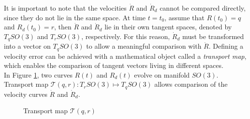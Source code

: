 It is important to note that the velocities $ \dot{R} $ and $ \dot{R}_d $ cannot be compared directly, since they do not lie in the same space. 
At time $ t=t_0 $, assume that $ R(t_0)=q$ and $R_d(t_0)=r$, then $ \dot{R} $ and $ \dot{R}_d $ lie in their own tangent spaces, denoted by $ T_qSO(3)$ and $ T_{r}SO(3)$, respectively. For this reason, $ \dot{R}_d $ must be transformed into a vector on $ T_qSO(3) $ to allow a meaningful comparison with $ \dot{R} $. 
Defining a velocity error can be achieved with a mathematical object called a \textit{transport map}, 
which enables the comparison of tangent vectors living in different spaces.\\ 
In Figure \ref{fig:con.transport}, two curves $ R(t) $ and $R_d(t)$ evolve on manifold $ SO(3) $. 
Transport map $ \mathcal{T}(q,r):T_{r}SO(3)\mapsto T_qSO(3) $ allows comparison of the velocity curves $ \dot{R} $ and $ \dot{R}_d $.
\begin{figure}[h!]
	\centering
	\caption{Transport map $ \mathcal{T}(q,r) $\label{fig:con.transport}}
\end{figure}		

